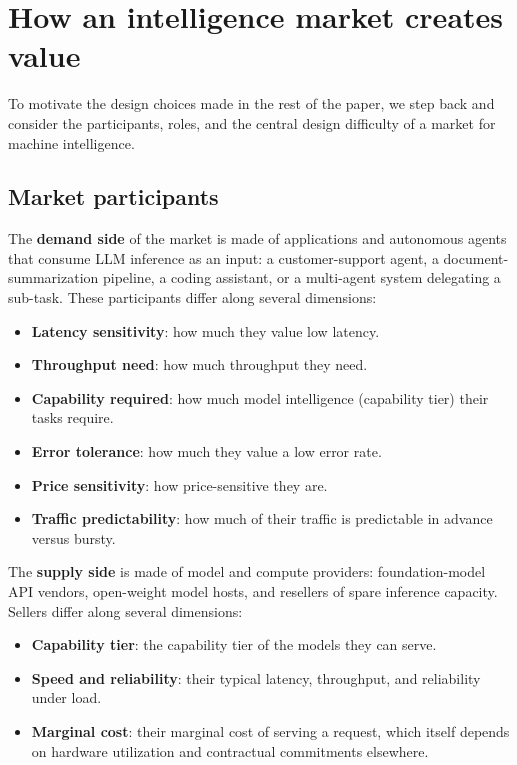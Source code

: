 \section{How an intelligence market creates value}
\label{sec:market_design}

To motivate the design choices made in the rest of the paper, we step back
and consider the participants, roles, and the central design difficulty of
a market for machine intelligence.

\subsection{Market participants}
\label{sec:market_participants}

The \textbf{demand side} of the market is made of applications and autonomous agents
that consume LLM inference as an input: a customer-support agent, a
document-summarization pipeline, a coding assistant, or a multi-agent system
delegating a sub-task. These participants differ along several dimensions:

\begin{itemize}
  \item \textbf{Latency sensitivity}: how much they value low latency.
  \item \textbf{Throughput need}: how much throughput they need.
  \item \textbf{Capability required}: how much model intelligence (capability
    tier) their tasks require.
  \item \textbf{Error tolerance}: how much they value a low error rate.
  \item \textbf{Price sensitivity}: how price-sensitive they are.
  \item \textbf{Traffic predictability}: how much of their traffic is
    predictable in advance versus bursty.
\end{itemize}

The \textbf{supply side} is made of model and compute providers: foundation-model
API vendors, open-weight model hosts, and resellers of spare inference
capacity. Sellers differ along several dimensions:

\begin{itemize}
  \item \textbf{Capability tier}: the capability tier of the models they can
    serve.
  \item \textbf{Speed and reliability}: their typical latency, throughput, and
    reliability under load.
  \item \textbf{Marginal cost}: their marginal cost of serving a request,
    which itself depends on hardware utilization and contractual commitments
    elsewhere.
\end{itemize}

